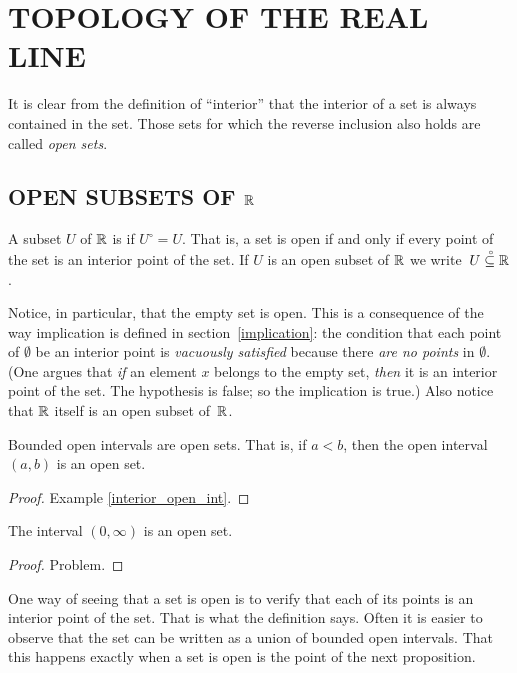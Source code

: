 \chapter{TOPOLOGY OF THE REAL LINE}\label{nbhds_in_r}

It is clear from the definition of ``interior'' that the interior of a set is always contained
in the set.  Those sets for which the reverse inclusion also holds are called \emph{open
sets}.

\section{OPEN SUBSETS OF $\mathbb{R}$}
\begin{defn} A subset $U$ of $\mathbb{R}$ is
 if $U^\circ = U$.  That is, a set is open if and only if every point of the set is
an interior point of the set.  If $U$ is an open subset of $\mathbb{R}$ we
write~$U\overset{\thickspace{}_\circ}{\subseteq}\mathbb{R}$.

Notice, in particular, that the empty set is open.  This is a consequence of the way
implication is defined in section~\ref{implication}: the condition that each point of
$\emptyset$ be an interior point is \emph{vacuously satisfied} because there \emph{are no
points} in $\emptyset$. (One argues that \emph{if} an element $x$ belongs to the empty
set, \emph{then} it is an interior point of the set.  The hypothesis is false; so the
implication is true.)  Also notice that $\mathbb{R}$ itself is an open subset of~$\mathbb{R}$.
\end{defn}

\begin{exam}\label{open_int_open} Bounded open intervals are open sets.  That is, if $a < b$,
then the open interval $(a,b)$ is an open set.
\end{exam}

\begin{proof} Example \ref{interior_open_int}. \end{proof}

\begin{exam} The interval $(0,\infty)$ is an open set.
\end{exam}

\begin{proof} Problem.  \ns \end{proof}

One way of seeing that a set is open is to verify that each of its points is an interior point
of the set.  That is what the definition says.  Often it is easier to observe that the set can
be written as a union of bounded open intervals.  That this happens exactly when a set is open
is the point of the next proposition.


